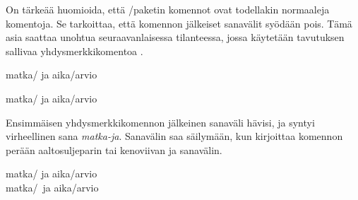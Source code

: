 
On tärkeää huomioida, että \-/paketin komennot ovat
todellakin normaaleja komentoja. Se tarkoittaa, että komennon jälkeiset
sanavälit syödään pois. Tämä asia saattaa unohtua seuraavanlaisessa
tilanteessa, jossa käytetään tavutuksen sallivaa yhdysmerkkikomentoa
\koodi{\keno-/}.

\pagebreak[3]

\begin{koodilohkosis}
  matka\-/ ja aika\-/arvio
\end{koodilohkosis}

\begin{tulossis}
  matka\-/ ja aika\-/arvio
\end{tulossis}

Ensimmäisen yhdysmerkkikomennon jälkeinen sanaväli hävisi, ja syntyi
virheellinen sana \emph{matka-ja}. Sanavälin saa säilymään, kun
kirjoittaa komennon perään aaltosuljeparin tai kenoviivan ja sanavälin.

\pagebreak[3]

\begin{koodilohkosis}
  matka\-/{} ja aika\-/arvio \\
  matka\-/\ ja aika\-/arvio
\end{koodilohkosis}

